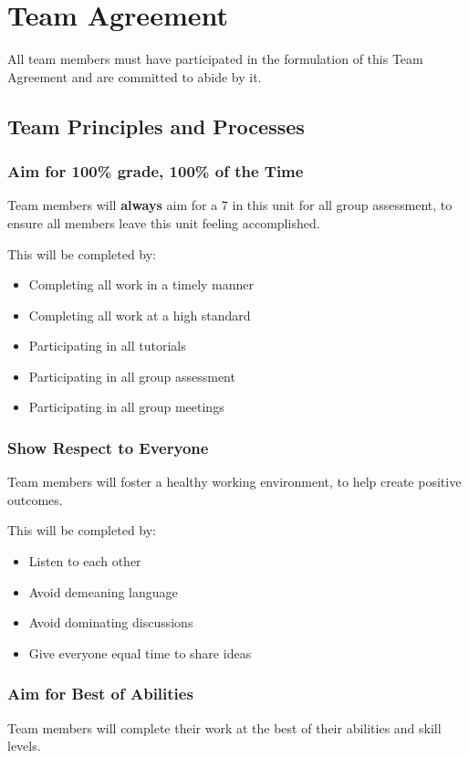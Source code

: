 \documentclass[12pt, a4paper, onecolumn]{article}
\begin{document}
\newpage
\section{Team Agreement}
All team members must have participated in the formulation of
this Team Agreement and are committed to abide by it.

\subsection{Team Principles and Processes}

\subsubsection{Aim for 100\% grade, 100\% of the Time}
Team members will \textbf{always} aim for a 7 in this unit for all group
assessment, to ensure all members leave this unit feeling accomplished.

This will be completed by:
\begin{itemize}
  \setlength\itemsep{1px}
  \item Completing all work in a timely manner
  \item Completing all work at a high standard
  \item Participating in all tutorials
  \item Participating in all group assessment
  \item Participating in all group meetings
\end{itemize}

\subsubsection{Show Respect to Everyone}
Team members will foster a healthy working environment, to help
create positive outcomes.

This will be completed by:
\begin{itemize}
  \setlength\itemsep{1px}
  \item Listen to each other
  \item Avoid demeaning language
  \item Avoid dominating discussions
  \item Give everyone equal time to share ideas
\end{itemize}

\subsubsection{Aim for Best of Abilities}
Team members will complete their work at the best of their abilities
and skill levels.
\end{document}
